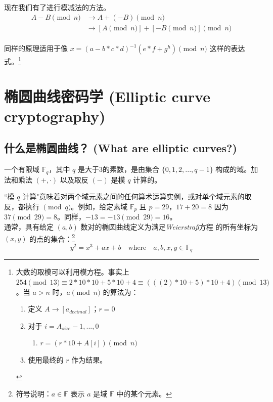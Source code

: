 现在我们有了进行模减法的方法。\vspace{.175cm}
\begin{align*}
A - B \pmod n &\rightarrow A + (-B) \pmod n \\
			  &\rightarrow {[A \pmod {n}] + [-B \pmod{n}]} \pmod{n}
\end{align*}\\

同样的原理适用于像 $x = (a-b*c*d)^{-1} (e*f+g^{h}) \pmod n$ 这样的表达式。\footnote{大数的取模可以利用模方程。事实上 $254 \pmod {13} \equiv 2*10*10 + 5*10 + 4 \equiv (((2)*10 + 5)*10 + 4) \pmod {13}$。当 $a > n$ 时，$a \pmod n$ 的算法为：
\begin{enumerate}
	\item 定义 $A \rightarrow [a_{decimal}]$；$r = 0$
	\item 对于 $i = A_{size} - 1,...,0$
	\begin{enumerate}
		\item $r = (r*10 + A[i]) \pmod n$
	\end{enumerate}
	\item 使用最终的 $r$ 作为结果。
\end{enumerate}}



\section{椭圆曲线密码学 (Elliptic curve cryptography)}
\label{EllipticCurveCryptography}


\subsection{什么是椭圆曲线？ (What are elliptic curves?)}
\label{elliptic_curves_section}

一个有限域 \(\mathbb{F}_q\)，其中 \(q\) 是大于3的素数，是由集合 \(\{0, 1, 2, ..., q-1\}\) 构成的域。加法和乘法 \((+,  \cdot)\) 以及取反 $(-)$ 是模 \(q\) 计算的。

``模 \(q\) 计算"意味着对两个域元素之间的任何算术运算实例，或对单个域元素的取反，都执行 \(\pmod q\)。例如，给定素域 \(\mathbb{F}_p\) 且 $p = 29$，$17+20=8$ 因为 $37 \pmod{29} = 8$。同样，$-13 = -13 \pmod{29} = 16$。\\

通常，具有给定 $(a,b)$ 数对的椭圆曲线定义为满足{\em Weierstraß}方程 \cite{Hankerson:2003:GEC:940321} 的所有坐标为 \((x, y)\) 的点的集合：\footnote{\label{notation1}符号说明：$a \in \mathbb{F}$ 表示 $a$ 是域 $\mathbb{F}$ 中的某个元素。}\vspace{.175cm}
\[y^2 = x^3 + a x + b \quad \textrm{where} \quad a, b, x, y \in \mathbb{F}_q\]

